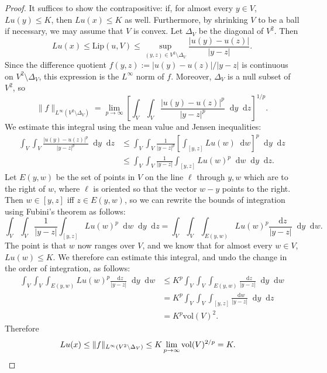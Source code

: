 \documentclass[reqno,11pt]{amsart}
\newcommand*\dif{\mathop{}\!\mathrm{d}}
\newcommand{\vol}{\mathrm{vol}}
\newcommand{\Lip}{\mathrm{Lip}}
\theoremstyle{definition}
\numberwithin{equation}{section}
\begin{document}
\begin{proof}
It suffices to show the contrapositive: if, for almost every $y \in V$, $Lu(y) \leq K$, then $Lu(x) \leq K$ as well.
Furthermore, by shrinking $V$ to be a ball if necessary, we may assume that $V$ is convex.
Let $\Delta_V$ be the diagonal of $V^2$. Then
$$Lu(x) \leq \Lip(u, V) \leq \sup_{(y, z) \in V^2 \setminus \Delta_V} \frac{|u(y) - u(z)|}{|y - z|}.$$
Since the difference quotient $f(y, z) := |u(y) - u(z)|/|y - z|$ is continuous on $V^2 \setminus \Delta_V$, this expression is the $L^\infty$ norm of $f$.
Moreover, $\Delta_V$ is a null subset of $V^2$, so
$$\|f\|_{L^\infty(V^2 \setminus \Delta_V)} = \lim_{p \to \infty} \left[\int_V \int_V \frac{|u(y) - u(z)|^p}{|y - z|^p} \dif y \dif z\right]^{1/p}.$$
We estimate this integral using the mean value and Jensen inequalities:
\begin{align*} 
\int_V \int_V \frac{|u(y) - u(z)|^p}{|y - z|^p} \dif y \dif z 
&\leq \int_V \int_V \frac{1}{|y - z|^p} \left[\int_{[y, z]} Lu(w) \dif w\right]^p \dif y \dif z \\
&\leq \int_V \int_V \frac{1}{|y - z|} \int_{[y, z]} Lu(w)^p \dif w \dif y \dif z. 
\end{align*}
Let $E(y, w)$ be the set of points in $V$ on the line $\ell$ through $y, w$ which are to the right of $w$, where $\ell$ is oriented so that the vector $w - y$ points to the right.
Then $w \in [y, z]$ iff $z \in E(y, w)$, so we can rewrite the bounds of integration using Fubini's theorem as follows:
$$\int_V \int_V \frac{1}{|y - z|} \int_{[y, z]} Lu(w)^p \dif w \dif y \dif z = \int_V \int_V \int_{E(y, w)} Lu(w)^p \frac{\dif z}{|y - z|} \dif y \dif w.$$
The point is that $w$ now ranges over $V$, and we know that for almost every $w \in V$, $Lu(w) \leq K$.
We therefore can estimate this integral, and undo the change in the order of integration, as follows:
\begin{align*} 
\int_V \int_V \int_{E(y, w)} Lu(w)^p \frac{\dif z}{|y - z|} \dif y \dif w
&\leq K^p \int_V \int_V \int_{E(y, w)} \frac{\dif z}{|y - z|} \dif y \dif w \\
&= K^p \int_V \int_V \int_{[y, z]} \frac{\dif w}{|y - z|} \dif y \dif z \\
&= K^p \vol(V)^2.
\end{align*}
Therefore 
\begin{align*}
Lu(x) &\leq \|f\|_{L^\infty(V^2 \setminus \Delta_V)} \leq K \lim_{p \to \infty} \vol(V)^{2/p} = K. \qedhere 
\end{align*}  
\end{proof}
\end{document}
